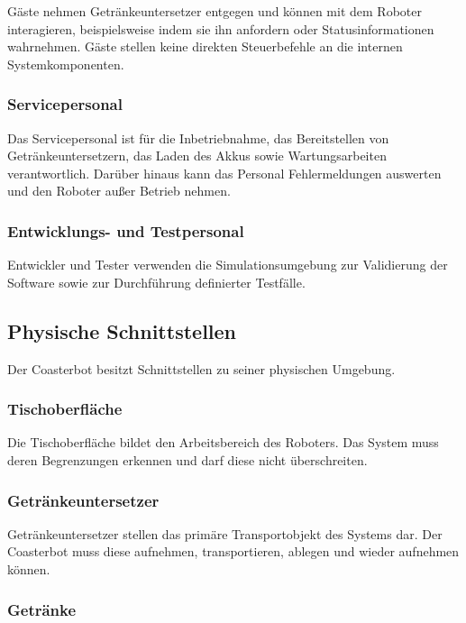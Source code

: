 Gäste nehmen Getränkeuntersetzer entgegen und können mit dem Roboter
interagieren, beispielsweise indem sie ihn anfordern oder
Statusinformationen wahrnehmen. Gäste stellen keine direkten
Steuerbefehle an die internen Systemkomponenten.

\subsubsection{Servicepersonal}\label{servicepersonal-1}

Das Servicepersonal ist für die Inbetriebnahme, das Bereitstellen von
Getränkeuntersetzern, das Laden des Akkus sowie Wartungsarbeiten
verantwortlich. Darüber hinaus kann das Personal Fehlermeldungen
auswerten und den Roboter außer Betrieb nehmen.

\subsubsection{Entwicklungs- und
Testpersonal}\label{entwicklungs--und-testpersonal}

Entwickler und Tester verwenden die Simulationsumgebung zur Validierung
der Software sowie zur Durchführung definierter Testfälle.

\subsection{Physische Schnittstellen}\label{physische-schnittstellen}

Der Coasterbot besitzt Schnittstellen zu seiner physischen Umgebung.

\subsubsection{Tischoberfläche}\label{tischoberfluxe4che}

Die Tischoberfläche bildet den Arbeitsbereich des Roboters. Das System
muss deren Begrenzungen erkennen und darf diese nicht überschreiten.

\subsubsection{Getränkeuntersetzer}\label{getruxe4nkeuntersetzer}

Getränkeuntersetzer stellen das primäre Transportobjekt des Systems dar.
Der Coasterbot muss diese aufnehmen, transportieren, ablegen und wieder
aufnehmen können.

\subsubsection{Getränke}\label{getruxe4nke}

